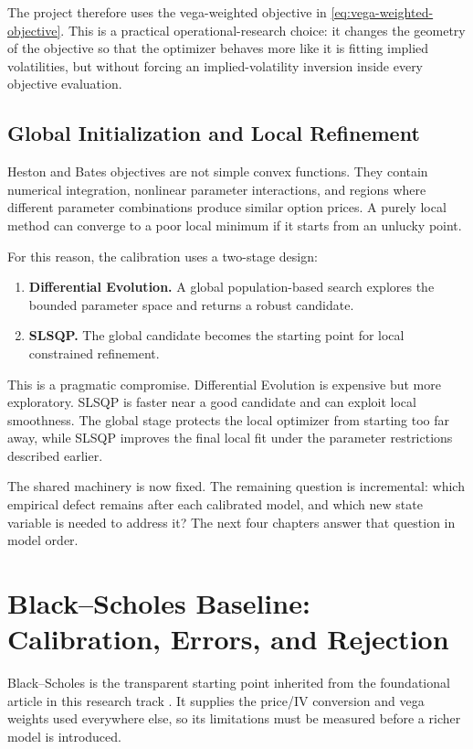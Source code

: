 \documentclass[a4paper,10pt,titlepage,oneside,openany]{book}
\theoremstyle{plain}
\theoremstyle{definition}
\theoremstyle{remark}
\begin{document}
The project therefore uses the vega-weighted objective in \eqref{eq:vega-weighted-objective}. This is a practical operational-research choice: it changes the geometry of the objective so that the optimizer behaves more like it is fitting implied volatilities, but without forcing an implied-volatility inversion inside every objective evaluation.

\section{Global Initialization and Local Refinement}

Heston and Bates objectives are not simple convex functions. They contain numerical integration, nonlinear parameter interactions, and regions where different parameter combinations produce similar option prices. A purely local method can converge to a poor local minimum if it starts from an unlucky point.

For this reason, the calibration uses a two-stage design:

\begin{enumerate}[leftmargin=8mm, itemsep=2pt]
    \item \textbf{Differential Evolution.} A global population-based search explores the bounded parameter space and returns a robust candidate.
    \item \textbf{SLSQP.} The global candidate becomes the starting point for local constrained refinement.
\end{enumerate}

This is a pragmatic compromise. Differential Evolution is expensive but more exploratory. SLSQP is faster near a good candidate and can exploit local smoothness. The global stage protects the local optimizer from starting too far away, while SLSQP improves the final local fit under the parameter restrictions described earlier.

The shared machinery is now fixed. The remaining question is incremental: which empirical defect remains after each calibrated model, and which new state variable is needed to address it? The next four chapters answer that question in model order.

\chapter{Black--Scholes Baseline: Calibration, Errors, and Rejection}

Black--Scholes is the transparent starting point inherited from the foundational article in this research track \cite{BarrickArticle1}. It supplies the price/IV conversion and vega weights used everywhere else, so its limitations must be measured before a richer model is introduced.
\end{document}
